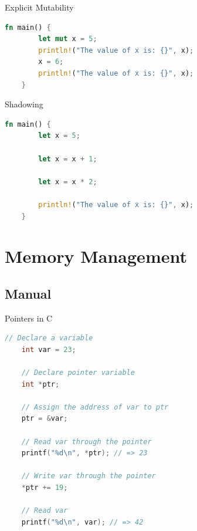 \begin{Frame}[fragile]{Explicit Mutability}
  \begin{lstlisting}[language=Rust,gobble=4]
    fn main() {
        let mut x = 5;
        println!("The value of x is: {}", x);
        x = 6;
        println!("The value of x is: {}", x);
    }
  \end{lstlisting}
\end{Frame}

\begin{Frame}[fragile]{Shadowing}
  \begin{lstlisting}[language=Rust,gobble=4]
    fn main() {
        let x = 5;

        let x = x + 1;

        let x = x * 2;

        println!("The value of x is: {}", x);
    }
  \end{lstlisting}
\end{Frame}


\lstset{basicstyle=\ttfamily}

\section{Memory Management}

\subsection{Manual}

\begin{Frame}[fragile]{Pointers in C}
  \begin{lstlisting}[language=C,gobble=4]
    // Declare a variable
    int var = 23;

    // Declare pointer variable 
    int *ptr; 
    
    // Assign the address of var to ptr
    ptr = &var;

    // Read var through the pointer
    printf("%d\n", *ptr); // => 23

    // Write var through the pointer
    *ptr += 19;

    // Read var
    printf("%d\n", var); // => 42
  \end{lstlisting}
\end{Frame}

